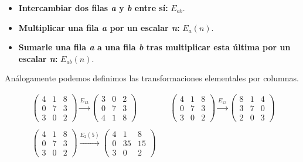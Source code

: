 \begin{itemize}
	\item\textbf{Intercambiar dos filas \textit{a} y \textit{b} entre sí:}
		$E_{ab}$.
	\item\textbf{Multiplicar una fila \textit{a} por un escalar \textit{n}:}
		$E_{a}(n)$.
	\item\textbf{Sumarle una fila \textit{a} a una fila \textit{b} tras multiplicar esta última por un escalar \textit{n}:}
		$E_{ab}(n)$.
\end{itemize}

Análogamente podemos definimos las transformaciones elementales por columnas.

\begin{figure}[h!]
\[
	\begin{array}{ccc}
		\begin{pmatrix}
			4 & 1 & 8 \\
			0 & 7 & 3 \\
			3 & 0 & 2
		\end{pmatrix}
		\xrightarrow{E_{13}}
		\begin{pmatrix}
			3 & 0 & 2 \\
			0 & 7 & 3 \\
			4 & 1 & 8
		\end{pmatrix}

		&&

		\begin{pmatrix}
			4 & 1 & 8 \\
			0 & 7 & 3 \\
			3 & 0 & 2
		\end{pmatrix}
		\xrightarrow{E_{13}}
		\begin{pmatrix}
			8 & 1 & 4 \\
			3 & 7 & 0 \\
			2 & 0 & 3
		\end{pmatrix}

		\\&&\\

		\begin{pmatrix}
			4 & 1 & 8 \\
			0 & 7 & 3 \\
			3 & 0 & 2
		\end{pmatrix}
		\xrightarrow{E_{2}(5)}
		\begin{pmatrix}
			4 & 1  & 8  \\
			0 & 35 & 15 \\
			3 & 0  & 2
		\end{pmatrix}


\end{array}\]
\end{figure}
